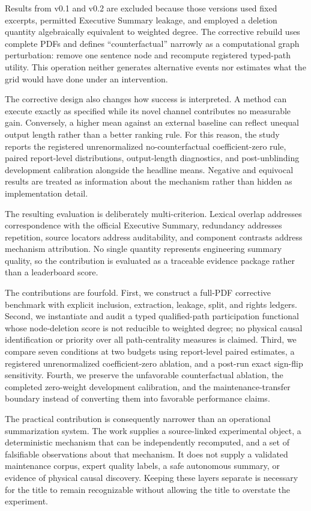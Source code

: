 \documentclass[applsci,article,submit,moreauthors]{Definitions/mdpi}
\begin{document}
Results from v0.1 and v0.2 are excluded because those versions used fixed excerpts, permitted Executive Summary leakage, and employed a deletion quantity algebraically equivalent to weighted degree. The corrective rebuild uses complete PDFs and defines ``counterfactual'' narrowly as a computational graph perturbation: remove one sentence node and recompute registered typed-path utility. This operation neither generates alternative events nor estimates what the grid would have done under an intervention.

The corrective design also changes how success is interpreted. A method can execute exactly as specified while its novel channel contributes no measurable gain. Conversely, a higher mean against an external baseline can reflect unequal output length rather than a better ranking rule. For this reason, the study reports the registered unrenormalized no-counterfactual coefficient-zero rule, paired report-level distributions, output-length diagnostics, and post-unblinding development calibration alongside the headline means. Negative and equivocal results are treated as information about the mechanism rather than hidden as implementation detail.

The resulting evaluation is deliberately multi-criterion. Lexical overlap addresses correspondence with the official Executive Summary, redundancy addresses repetition, source locators address auditability, and component contrasts address mechanism attribution. No single quantity represents engineering summary quality, so the contribution is evaluated as a traceable evidence package rather than a leaderboard score.

The contributions are fourfold. First, we construct a full-PDF corrective benchmark with explicit inclusion, extraction, leakage, split, and rights ledgers. Second, we instantiate and audit a typed qualified-path participation functional whose node-deletion score is not reducible to weighted degree; no physical causal identification or priority over all path-centrality measures is claimed. Third, we compare seven conditions at two budgets using report-level paired estimates, a registered unrenormalized coefficient-zero ablation, and a post-run exact sign-flip sensitivity. Fourth, we preserve the unfavorable counterfactual ablation, the completed zero-weight development calibration, and the maintenance-transfer boundary instead of converting them into favorable performance claims.

The practical contribution is consequently narrower than an operational summarization system. The work supplies a source-linked experimental object, a deterministic mechanism that can be independently recomputed, and a set of falsifiable observations about that mechanism. It does not supply a validated maintenance corpus, expert quality labels, a safe autonomous summary, or evidence of physical causal discovery. Keeping these layers separate is necessary for the title to remain recognizable without allowing the title to overstate the experiment.
\end{document}
